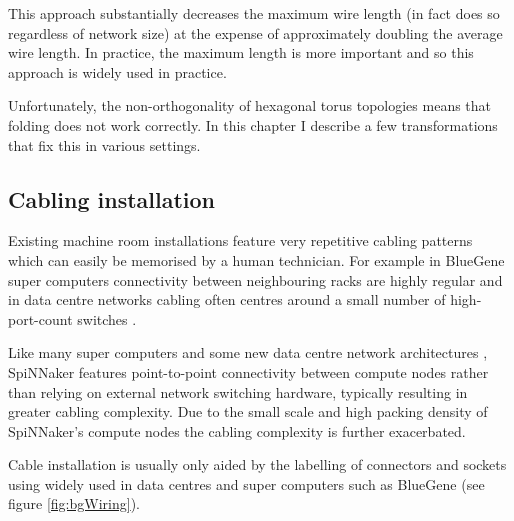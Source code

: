 			This approach substantially decreases the maximum wire length (in fact
			does so regardless of network size) at the expense of approximately
			doubling the average wire length. In practice, the maximum length is more
			important and so this approach is widely used in practice.
			
			Unfortunately, the non-orthogonality of hexagonal torus topologies means
			that folding does not work correctly. In this chapter I describe a few
			transformations that fix this in various settings.
		
		\subsection{Cabling installation}
			
			Existing machine room installations feature very repetitive cabling
			patterns which can easily be memorised by a human technician.  For
			example in BlueGene super computers connectivity between neighbouring
			racks are highly regular \cite{lakner07} and in data centre networks
			cabling often centres around a small number of high-port-count switches
			\cite{cisco07,csernai15}.
			
			Like many super computers and some new data centre network architectures
			\cite{abu11}, SpiNNaker features point-to-point connectivity between
			compute nodes rather than relying on external network switching hardware,
			typically resulting in greater cabling complexity. Due to the small scale
			and high packing density of SpiNNaker's compute nodes the cabling
			complexity is further exacerbated.
			
			Cable installation is usually only aided by the labelling of connectors
			and sockets using widely used in data centres \cite{tia2006} and super
			computers such as BlueGene (see figure \ref{fig:bgWiring}).
			
